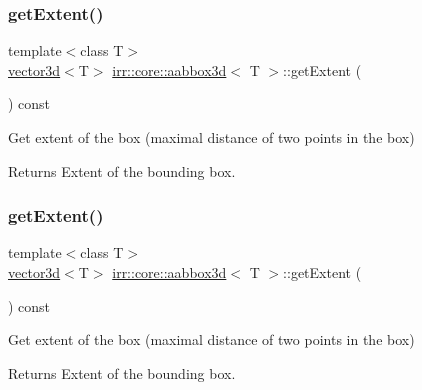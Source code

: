 \subsubsection{\texorpdfstring{get\+Extent()}{getExtent()}\hspace{0.1cm}{\footnotesize\ttfamily [1/2]}}
{\footnotesize\ttfamily template$<$class T$>$ \\
\hyperlink{classirr_1_1core_1_1vector3d}{vector3d}$<$T$>$ \hyperlink{classirr_1_1core_1_1aabbox3d}{irr\+::core\+::aabbox3d}$<$ T $>$\+::get\+Extent (\begin{DoxyParamCaption}{ }\end{DoxyParamCaption}) const\hspace{0.3cm}{\ttfamily [inline]}}



Get extent of the box (maximal distance of two points in the box) 

\begin{DoxyReturn}{Returns}
Extent of the bounding box. 
\end{DoxyReturn}
\mbox{\label{classirr_1_1core_1_1aabbox3d_a6a1e82ae4fdb3cf9fac19905b772e03e}} 
\subsubsection{\texorpdfstring{get\+Extent()}{getExtent()}\hspace{0.1cm}{\footnotesize\ttfamily [2/2]}}
{\footnotesize\ttfamily template$<$class T$>$ \\
\hyperlink{classirr_1_1core_1_1vector3d}{vector3d}$<$T$>$ \hyperlink{classirr_1_1core_1_1aabbox3d}{irr\+::core\+::aabbox3d}$<$ T $>$\+::get\+Extent (\begin{DoxyParamCaption}{ }\end{DoxyParamCaption}) const\hspace{0.3cm}{\ttfamily [inline]}}



Get extent of the box (maximal distance of two points in the box) 

\begin{DoxyReturn}{Returns}
Extent of the bounding box. 
\end{DoxyReturn}
\mbox{\label{classirr_1_1core_1_1aabbox3d_a2c2073f3693819d99906f2ae36dd19de}} 

